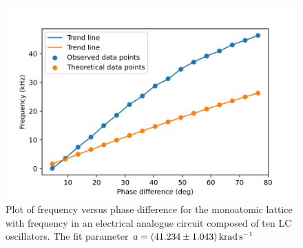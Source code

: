 \documentclass[%
 aip,
 amsmath,amssymb,
 reprint, floatfix%
]{revtex4-1}
\begin{document}
    \begin{figure}
        \centering
        \includegraphics[scale = 0.56]{Figures/plot-di.png}
        \caption{Plot of frequency versus phase difference for the monoatomic lattice with frequency in an electrical analogue circuit composed of ten LC oscillators. The fit parameter $a = \SI[separate-uncertainty=true]{41.234 \pm 1.043}{\kilo \radian \per \second}$}
        \label{fig:10mono}
    \end{figure}
\end{document}
